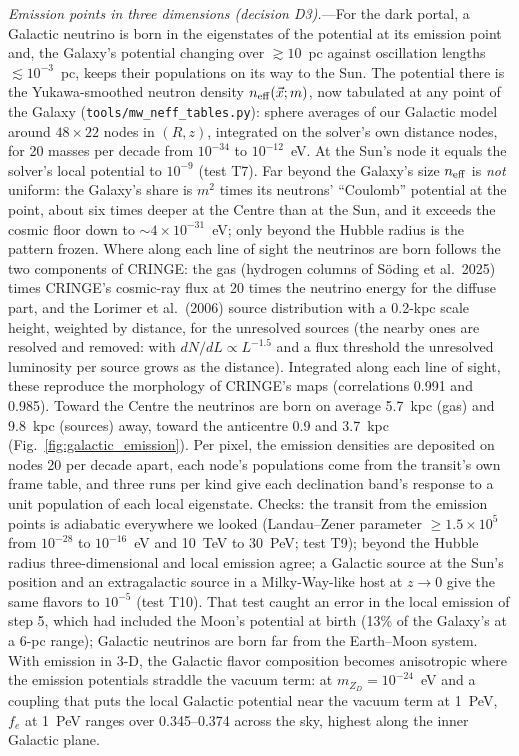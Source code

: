 \documentclass[11pt,a4paper]{article}
\newcommand{\file}[1]{\nolinkurl{#1}}
\begin{document}
\textit{Emission points in three dimensions (decision D3).}---For the dark portal, a Galactic neutrino is
born in the eigenstates of the potential at its emission point and, the Galaxy's potential changing over
$\gtrsim 10$~pc against oscillation lengths $\lesssim 10^{-3}$~pc, keeps their populations on its way to the
Sun. The potential there is the Yukawa-smoothed neutron density $n_{\rm eff}(\vec x; m)$, now tabulated at any
point of the Galaxy (\file{tools/mw_neff_tables.py}): sphere averages of our Galactic model around $48\times22$
nodes in $(R, z)$, integrated on the solver's own distance nodes, for 20 masses per decade from $10^{-34}$ to
$10^{-12}$~eV. At the Sun's node it equals the solver's local potential to $10^{-9}$ (test T7). Far beyond the
Galaxy's size $n_{\rm eff}$ is \emph{not} uniform: the Galaxy's share is $m^2$ times its neutrons'
``Coulomb'' potential at the point, about six times deeper at the Centre than at the Sun, and it exceeds the
cosmic floor down to $\sim4\times10^{-31}$~eV; only beyond the Hubble radius is the pattern frozen.
Where along each line of sight the neutrinos are born follows the two components of CRINGE: the gas (hydrogen
columns of S\"oding et al.\ 2025) times CRINGE's cosmic-ray flux at 20 times the neutrino energy for the
diffuse part, and the Lorimer et al.\ (2006) source distribution with a 0.2-kpc scale height, weighted by
distance, for the unresolved sources (the nearby ones are resolved and removed: with $dN/dL\propto L^{-1.5}$
and a flux threshold the unresolved luminosity per source grows as the distance). Integrated along each line
of sight, these reproduce the morphology of CRINGE's maps (correlations 0.991 and 0.985). Toward the Centre
the neutrinos are born on average 5.7~kpc (gas) and 9.8~kpc (sources) away, toward the anticentre 0.9 and
3.7~kpc (Fig.~\ref{fig:galactic_emission}). Per pixel, the emission densities are deposited on nodes 20 per
decade apart, each node's populations come from the transit's own frame table, and three runs per kind give
each declination band's response to a unit population of each local eigenstate. Checks: the transit from the
emission points is adiabatic everywhere we looked (Landau--Zener parameter $\ge 1.5\times10^5$ from
$10^{-28}$ to $10^{-16}$~eV and 10~TeV to 30~PeV; test T9); beyond the Hubble radius three-dimensional and
local emission agree; a Galactic source at the Sun's position and an extragalactic source in a
Milky-Way-like host at $z\to0$ give the same flavors to $10^{-5}$ (test T10). That test caught an error in
the local emission of step 5, which had included the Moon's potential at birth (13\% of the Galaxy's at a
6-pc range); Galactic neutrinos are born far from the Earth--Moon system. With emission in 3-D, the Galactic
flavor composition becomes anisotropic where the emission potentials straddle the vacuum term: at
$m_{Z_D} = 10^{-24}$~eV and a coupling that puts the local Galactic potential near the vacuum term at 1~PeV,
$f_e$ at 1~PeV ranges over 0.345--0.374 across the sky, highest along the inner Galactic plane.
\end{document}
